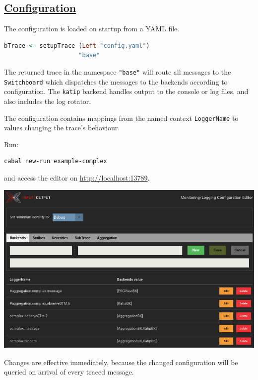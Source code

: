 \begin{mdframed}
    \section*{\href{https://github.com/The-Blockchain-Company/tbco-monitoring-framework/blob/master/tbco-monitoring/src/Bcc/BM/Configuration/Model.lhs}{Configuration}}

The configuration is loaded on startup from a YAML file.

    \begin{lstlisting}[language=Haskell]
bTrace <- setupTrace (Left "config.yaml")
                     "base"
    \end{lstlisting}

    The returned trace in the namespace \texttt{"base"} will route all messages to the \texttt{Switchboard} which dispatches the messages to the backends according to configuration. The \texttt{katip} backend handles output to the console or log files, and also includes the log rotator.

The configuration contains mappings from the named context \texttt{LoggerName} to values changing the trace's behaviour.

Run:

    \begin{lstlisting}[language=Bash]
cabal new-run example-complex
    \end{lstlisting}

and access the editor on \href{http://localhost:13789}{http://localhost:13789}.
    
{\includegraphics[scale=0.31]{tex/img/screen.png}}
    
Changes are effective immediately, because the changed configuration will be queried on arrival of every traced message.
\end{mdframed}


